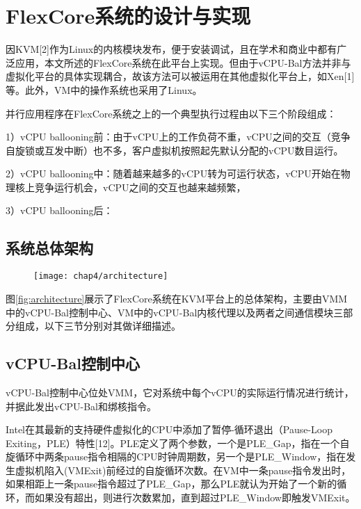 \section{FlexCore系统的设计与实现}

因KVM[2]作为Linux的内核模块发布，便于安装调试，且在学术和商业中都有广泛应用，本文所述的FlexCore系统在此平台上实现。但由于vCPU-Bal方法并非与虚拟化平台的具体实现耦合，故该方法可以被运用在其他虚拟化平台上，如Xen[1]等。此外，VM中的操作系统也采用了Linux。

并行应用程序在FlexCore系统之上的一个典型执行过程由以下三个阶段组成：

1）vCPU ballooning前：由于vCPU上的工作负荷不重，vCPU之间的交互（竞争自旋锁或互发中断）也不多，客户虚拟机按照起先默认分配的vCPU数目运行。

2）vCPU ballooning中：随着越来越多的vCPU转为可运行状态，vCPU开始在物理核上竞争运行机会，vCPU之间的交互也越来越频繁，

3）vCPU ballooning后：

\subsection{系统总体架构}

\begin{figure}[!htp]
  \centering
  \texttt{[image: chap4/architecture]}
\end{figure}

图\ref{fig:architecture}展示了FlexCore系统在KVM平台上的总体架构，主要由VMM中的vCPU-Bal控制中心、VM中的vCPU-Bal内核代理以及两者之间通信模块三部分组成，以下三节分别对其做详细描述。

\subsection{vCPU-Bal控制中心}

vCPU-Bal控制中心位处VMM，它对系统中每个vCPU的实际运行情况进行统计，并据此发出vCPU-Bal和绑核指令。

Intel在其最新的支持硬件虚拟化的CPU中添加了暂停-循环退出（Pause-Loop Exiting，PLE）特性[12]。PLE定义了两个参数，一个是PLE\_Gap，指在一个自旋循环中两条pause指令相隔的CPU时钟周期数，另一个是PLE\_Window，指在发生虚拟机陷入(VMExit)前经过的自旋循环次数。在VM中一条pause指令发出时，如果相距上一条pause指令超过了PLE\_Gap，那么PLE就认为开始了一个新的循环，而如果没有超出，则进行次数累加，直到超过PLE\_Window即触发VMExit。

